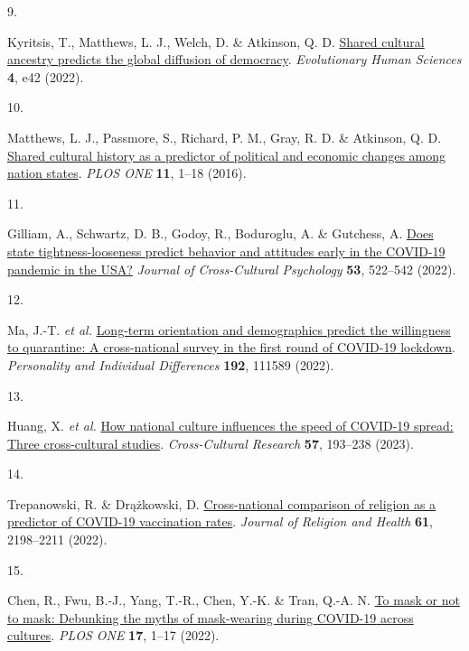 \documentclass[
  man, donotrepeattitle,floatsintext]{apa6}
\newlength{\cslhangindent}
\newlength{\csllabelwidth}
\newlength{\cslentryspacingunit} %
\newenvironment{CSLReferences}[2] %
 {%
  \setlength{\parindent}{0pt}
  \ifodd #1
  \let\oldpar\par
  \def\par{\hangindent=\cslhangindent\oldpar}
  \fi
  \setlength{\parskip}{#2\cslentryspacingunit}
 }%
 {}
\newcommand{\CSLLeftMargin}[1]{\parbox[t]{\csllabelwidth}{#1}}
\newcommand{\CSLRightInline}[1]{\parbox[t]{\linewidth - \csllabelwidth}{#1}\break}
\begin{document}
\begin{CSLReferences}{0}{0}
\leavevmode{}%
\CSLLeftMargin{9. }%
\CSLRightInline{Kyritsis, T., Matthews, L. J., Welch, D. \& Atkinson, Q. D. \href{https://doi.org/10.1017/ehs.2022.40}{Shared cultural ancestry predicts the global diffusion of democracy}. \emph{Evolutionary Human Sciences} \textbf{4}, e42 (2022).}

\leavevmode{}%
\CSLLeftMargin{10. }%
\CSLRightInline{Matthews, L. J., Passmore, S., Richard, P. M., Gray, R. D. \& Atkinson, Q. D. \href{https://doi.org/10.1371/journal.pone.0152979}{Shared cultural history as a predictor of political and economic changes among nation states}. \emph{PLOS ONE} \textbf{11}, 1--18 (2016).}

\leavevmode{}%
\CSLLeftMargin{11. }%
\CSLRightInline{Gilliam, A., Schwartz, D. B., Godoy, R., Boduroglu, A. \& Gutchess, A. \href{https://doi.org/10.1177/00220221221077710}{Does state tightness-looseness predict behavior and attitudes early in the {COVID-19} pandemic in the USA?} \emph{Journal of Cross-Cultural Psychology} \textbf{53}, 522--542 (2022).}

\leavevmode{}%
\CSLLeftMargin{12. }%
\CSLRightInline{Ma, J.-T. \emph{et al.} \href{https://doi.org/10.1016/j.paid.2022.111589}{Long-term orientation and demographics predict the willingness to quarantine: A cross-national survey in the first round of {COVID-19} lockdown}. \emph{Personality and Individual Differences} \textbf{192}, 111589 (2022).}

\leavevmode{}%
\CSLLeftMargin{13. }%
\CSLRightInline{Huang, X. \emph{et al.} \href{https://doi.org/10.1177/10693971221141478}{How national culture influences the speed of {COVID-19} spread: Three cross-cultural studies}. \emph{Cross-Cultural Research} \textbf{57}, 193--238 (2023).}

\leavevmode{}%
\CSLLeftMargin{14. }%
\CSLRightInline{Trepanowski, R. \& Drążkowski, D. \href{https://doi.org/10.1007/s10943-022-01569-7}{Cross-national comparison of religion as a predictor of {COVID-19} vaccination rates}. \emph{Journal of Religion and Health} \textbf{61}, 2198--2211 (2022).}

\leavevmode{}%
\CSLLeftMargin{15. }%
\CSLRightInline{Chen, R., Fwu, B.-J., Yang, T.-R., Chen, Y.-K. \& Tran, Q.-A. N. \href{https://doi.org/10.1371/journal.pone.0270160}{To mask or not to mask: Debunking the myths of mask-wearing during {COVID-19} across cultures}. \emph{PLOS ONE} \textbf{17}, 1--17 (2022).}


\end{CSLReferences}
\end{document}
